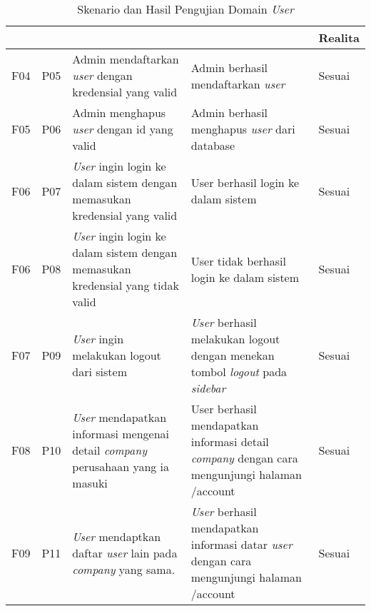 \bgroup
\begin{table}[ht]
  \def\arraystretch{1.3}
  \caption{Skenario dan Hasil Pengujian Domain \textit{User}}
  \label{tab:pengujian-domain-user}
  \centering
  \begin{tabular}{|p{2cm}|p{2cm}|p{4cm}|p{3cm}|p{2cm}|}
    \hline
    \centering{ID Fungsional} & \centering{ID Pengujian} & \centering{Skenario}                                                                           & \centering{Ekspektasi}                                                                                    & Realita \\
    \hline
    F04                       & P05                      & Admin mendaftarkan \textit{user} dengan kredensial yang valid                                  & Admin berhasil mendaftarkan \textit{user}                                                                 & Sesuai  \\
    \hline
    F05                       & P06                      & Admin menghapus \textit{user} dengan id yang valid                                             & Admin berhasil menghapus \textit{user} dari database                                                      & Sesuai  \\
    \hline
    F06                       & P07                      & \textit{User} ingin login ke dalam sistem dengan memasukan kredensial yang valid               & User berhasil login ke dalam sistem                                                                       & Sesuai  \\
    \hline
    F06                       & P08                      & \textit{User} ingin login ke dalam sistem dengan memasukan kredensial yang tidak valid         & User tidak berhasil login ke dalam sistem                                                                 & Sesuai  \\
    \hline
    F07                       & P09                      & \textit{User} ingin melakukan logout dari sistem                                               & \textit{User} berhasil melakukan logout dengan menekan tombol \textit{logout} pada \textit{sidebar}       & Sesuai  \\
    \hline
    F08                       & P10                      & \textit{User} mendapatkan informasi mengenai detail \textit{company} perusahaan yang ia masuki & {User} berhasil mendapatkan informasi detail \textit{company} dengan cara mengunjungi halaman /account    & Sesuai  \\
    \hline
    F09                       & P11                      & \textit{User} mendaptkan daftar \textit{user} lain pada \textit{company} yang sama.            & \textit{User} berhasil mendapatkan informasi datar \textit{user} dengan cara mengunjungi halaman /account & Sesuai  \\
    \hline
  \end{tabular}
\end{table}
\egroup

\pagebreak